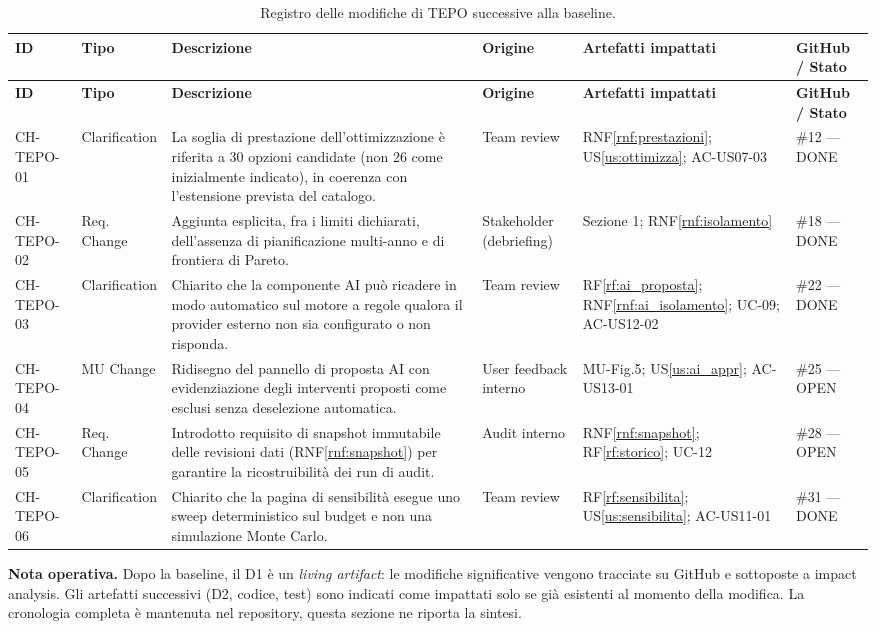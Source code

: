 \begin{longtable}{p{1.6cm} p{1.7cm} p{4.5cm} p{2.2cm} p{3cm} p{2.5cm}}
\caption{Registro delle modifiche di TEPO successive alla baseline.}\\
\toprule
\textbf{ID} & \textbf{Tipo} & \textbf{Descrizione} & \textbf{Origine} & \textbf{Artefatti impattati} & \textbf{GitHub / Stato} \\
\midrule
\endfirsthead
\toprule
\textbf{ID} & \textbf{Tipo} & \textbf{Descrizione} & \textbf{Origine} & \textbf{Artefatti impattati} & \textbf{GitHub / Stato} \\
\midrule
\endhead

CH-TEPO-01 & Clarification & La soglia di prestazione dell'ottimizzazione è riferita a 30 opzioni candidate (non 26 come inizialmente indicato), in coerenza con l'estensione prevista del catalogo. & Team review & RNF\ref{rnf:prestazioni}; US\ref{us:ottimizza}; AC-US07-03 & \#12 --- DONE \\
CH-TEPO-02 & Req. Change & Aggiunta esplicita, fra i limiti dichiarati, dell'assenza di pianificazione multi-anno e di frontiera di Pareto. & Stakeholder (debriefing) & Sezione 1; RNF\ref{rnf:isolamento} & \#18 --- DONE \\
CH-TEPO-03 & Clarification & Chiarito che la componente AI può ricadere in modo automatico sul motore a regole qualora il provider esterno non sia configurato o non risponda. & Team review & RF\ref{rf:ai_proposta}; RNF\ref{rnf:ai_isolamento}; UC-09; AC-US12-02 & \#22 --- DONE \\
CH-TEPO-04 & MU Change & Ridisegno del pannello di proposta AI con evidenziazione degli interventi proposti come esclusi senza deselezione automatica. & User feedback interno & MU-Fig.5; US\ref{us:ai_appr}; AC-US13-01 & \#25 --- OPEN \\
CH-TEPO-05 & Req. Change & Introdotto requisito di snapshot immutabile delle revisioni dati (RNF\ref{rnf:snapshot}) per garantire la ricostruibilità dei run di audit. & Audit interno & RNF\ref{rnf:snapshot}; RF\ref{rf:storico}; UC-12 & \#28 --- OPEN \\
CH-TEPO-06 & Clarification & Chiarito che la pagina di sensibilità esegue uno sweep deterministico sul budget e non una simulazione Monte Carlo. & Team review & RF\ref{rf:sensibilita}; US\ref{us:sensibilita}; AC-US11-01 & \#31 --- DONE \\

\bottomrule
\end{longtable}

\textbf{Nota operativa.} Dopo la baseline, il D1 è un \emph{living artifact}: le modifiche significative vengono tracciate su GitHub e sottoposte a impact analysis. Gli artefatti successivi (D2, codice, test) sono indicati come impattati solo se già esistenti al momento della modifica. La cronologia completa è mantenuta nel repository, questa sezione ne riporta la sintesi.